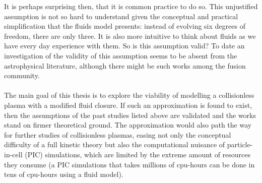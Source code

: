 It is perhaps surprising then, that it is common practice to do so. This unjustified assumption is not so hard to understand given the conceptual and practical simplification that the fluids model presents: instead of evolving six degrees of freedom, there are only three. It is also more intuitive to think about fluids as we have every day experience with them. So is this assumption valid? To date an investigation of the validity of this assumption seems to be absent from the astrophysical literature, although there might be such works among the fusion community.\\
\\
The main goal of this thesis is to explore the viability of modelling a collisionless plasma with a modified fluid closure. If such an approximation is found to exist, then the assumptions of the past studies listed above are validated and the works stand on firmer theoretical ground. The approximation would also path the way for further studies of collisionless plasmas, easing not only the conceptual difficulty of a full kinetic theory but also the computational nuisance of particle-in-cell (PIC) simulations, which are limited by the extreme amount of resources they consume (a PIC simulations that takes millions of cpu-hours can be done in tens of cpu-hours using a fluid model).

